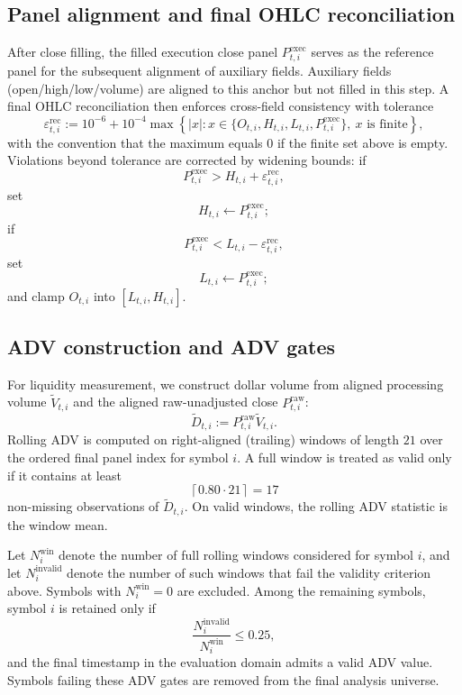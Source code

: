 \documentclass[11pt,a4paper]{article}
\begin{document}
\subsection{Panel alignment and final OHLC reconciliation}

After close filling, the filled execution close panel
\(P^{\mathrm{exec}}_{t,i}\) serves as the reference panel for the subsequent
alignment of auxiliary fields. Auxiliary fields (open/high/low/volume) are
aligned to this anchor but not filled in this step. A final OHLC reconciliation
then enforces cross-field consistency with tolerance
\[
\varepsilon_{t,i}^{\mathrm{rec}}
:=
10^{-6}
+10^{-4}
\max\!\left\{
|x|:x\in\{O_{t,i},H_{t,i},L_{t,i},P^{\mathrm{exec}}_{t,i}\},
\ x\text{ is finite}
\right\},
\]
with the convention that the maximum equals \(0\) if the finite set above is
empty. Violations beyond tolerance are corrected by widening bounds: if \[ P^{\mathrm{exec}}_{t,i}>H_{t,i}+\varepsilon_{t,i}^{\mathrm{rec}}, \] set \[ H_{t,i}\leftarrow P^{\mathrm{exec}}_{t,i}; \] if \[ P^{\mathrm{exec}}_{t,i}<L_{t,i}-\varepsilon_{t,i}^{\mathrm{rec}}, \] set \[ L_{t,i}\leftarrow P^{\mathrm{exec}}_{t,i}; \] and clamp \(O_{t,i}\) into \([L_{t,i},H_{t,i}]\).

\subsection{ADV construction and ADV gates}

For liquidity measurement, we construct dollar volume from aligned processing
volume \(\widetilde V_{t,i}\) and the aligned raw-unadjusted close
\(P^{\mathrm{raw}}_{t,i}\):
\[
\widetilde D_{t,i}:=
P^{\mathrm{raw}}_{t,i}\widetilde V_{t,i}.
\]
Rolling ADV is computed on right-aligned (trailing) windows of length \(21\)
over the ordered final panel index for symbol \(i\). A full window is treated
as valid only if it contains at least
\[
\left\lceil 0.80 \cdot 21 \right\rceil = 17
\]
non-missing observations of \(\widetilde D_{t,i}\). On valid windows, the
rolling ADV statistic is the window mean.

Let \(N_i^{\mathrm{win}}\) denote the number of full rolling windows considered
for symbol \(i\), and let \(N_i^{\mathrm{invalid}}\) denote the number of such
windows that fail the validity criterion above. Symbols with
\(N_i^{\mathrm{win}}=0\) are excluded. Among the remaining symbols, symbol
\(i\) is retained only if
\[
\frac{N_i^{\mathrm{invalid}}}{N_i^{\mathrm{win}}}\le 0.25,
\]
and the final timestamp in the evaluation domain admits a valid ADV value.
Symbols failing these ADV gates are removed from the final analysis universe.
\end{document}
